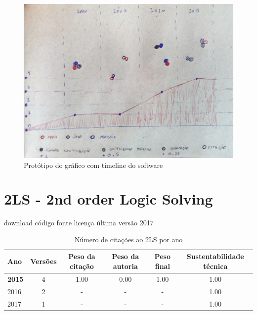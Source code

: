 
%

\label{softwares-summary}

\begin{figure}[h]
  \center
  \includegraphics[scale=0.35]{imagens/software-timeline-wireframe.jpg}
  \caption{Protótipo do gráfico com timeline do software}
\end{figure}

\section{2LS - 2nd order Logic Solving}
\checkmark download
\checkmark código fonte
\checkmark licença
\checkmark última versão 2017


\begin{table}[H]
\caption{Número de citações ao 2LS  por ano}
\centering
\begin{tabular}{| l | c | c | c | c | c |}
  \hline
  Ano & Versões & Peso da citação & Peso da autoria & Peso final & Sustentabilidade técnica \\
  \hline
            {\bf 2015}
          &
          4
          &
          1.00
          &
          0.00
          &
          1.00
          &
            {\color{blue} 1.00}
          \\
\hline
        2016 & 2 & - & - & -
        &
          {\color{blue} 1.00}
        \\
\hline
        2017 & 1 & - & - & -
        &
          {\color{blue} 1.00}
        \\
\hline
\end{tabular}
\end{table}



